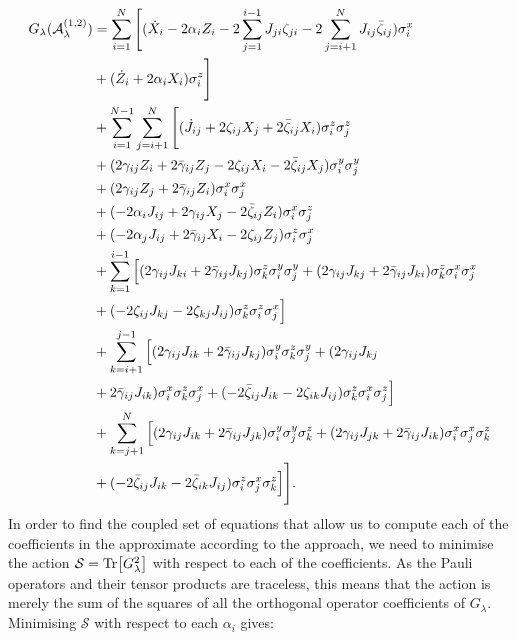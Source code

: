 \begin{equation}\label{eq:ising_graph_G_operator}
    \begin{aligned}
        G_{\lambda}(\mathcal{A}_{\lambda}^{(1,2)}) &= \sum_{i=1}^N \Bigg[ (\dot{X}_i - 2\alpha_i Z_i - 2\sum_{j=1}^{i-1} J_{ji}\zeta_{ji} - 2\sum_{j=i+1}^N J_{ij}\Bar{\zeta}_{ij})\sigma^x_i \\
        &+ (\dot{Z}_i + 2\alpha_i X_i)\sigma^z_i \Bigg] \\
        &+ \sum_{i = 1}^{N-1} \sum_{j = i+1}^{N} \Bigg[(\dot{J}_{ij} + 2\zeta_{ij} X_j + 2\Bar{\zeta}_{ij} X_i)\sigma^z_i\sigma^z_j \\
        &+ (2\gamma_{ij}Z_i + 2\Bar{\gamma}_{ij} Z_j - 2 \zeta_{ij} X_i - 2 \Bar{\zeta}_{ij} X_j)\sigma^y_i\sigma^y_j \\
        &+ (2\gamma_{ij}Z_j + 2\Bar{\gamma}_{ij} Z_i)\sigma^x_i\sigma^x_j \\
        &+ (-2\alpha_i J_{ij} + 2\gamma_{ij}X_j - 2\Bar{\zeta}_{ij} Z_i)\sigma^x_i\sigma^z_j \\
        &+ (-2\alpha_j J_{ij} + 2\Bar{\gamma}_{ij}X_i - 2\zeta_{ij} Z_j)\sigma^z_i\sigma^x_j \\
        &+ \sum_{k = 1}^{i-1} \Big[ (2\gamma_{ij}J_{ki} + 2\Bar{\gamma}_{ij} J_{kj})\sigma^z_k\sigma^y_i\sigma^y_j + (2\gamma_{ij}J_{kj} + 2\Bar{\gamma}_{ij} J_{ki})\sigma^z_k\sigma^x_i\sigma^x_j \\
        &+ (- 2 \zeta_{ij} J_{kj} - 2 \zeta_{kj}J_{ij})\sigma^z_k\sigma^z_i\sigma^x_j \Big] \\
        &+ \sum_{k = i+1}^{j-1} \Big[ (2\gamma_{ij}J_{ik} + 2\Bar{\gamma}_{ij} J_{kj})\sigma^y_i\sigma^z_k\sigma^y_j + (2\gamma_{ij}J_{kj} \\
        &+ 2\Bar{\gamma}_{ij} J_{ik})\sigma^x_i\sigma^z_k\sigma^x_j + (- 2 \Bar{\zeta}_{ij} J_{ik} - 2 \zeta_{ik}J_{ij})\sigma^z_k\sigma^x_i\sigma^z_j \Big] \\
        &+ \sum_{k = j+1}^N \Big[ (2\gamma_{ij}J_{ik} + 2\Bar{\gamma}_{ij} J_{jk})\sigma^y_i\sigma^y_j\sigma^z_k + (2\gamma_{ij}J_{jk} + 2\Bar{\gamma}_{ij} J_{ik})\sigma^x_i\sigma^x_j\sigma^z_k \\
        &+ (- 2 \Bar{\zeta}_{ij} J_{ik} - 2 \Bar{\zeta}_{ik}J_{ij})\sigma^z_i\sigma^x_j\sigma^z_k \Big] \Bigg].
    \end{aligned}
\end{equation}
In order to find the coupled set of equations that allow us to compute each of the coefficients in the approximate  according to the  approach, we need to minimise the action $\mathcal{S} = \Tr[G_{\lambda}^2]$ with respect to each of the coefficients. As the Pauli operators and their tensor products are traceless, this means that the action is merely the sum of the squares of all the orthogonal operator coefficients of $G_{\lambda}$. Minimising $\mathcal{S}$ with respect to each $\alpha_i$ gives:
